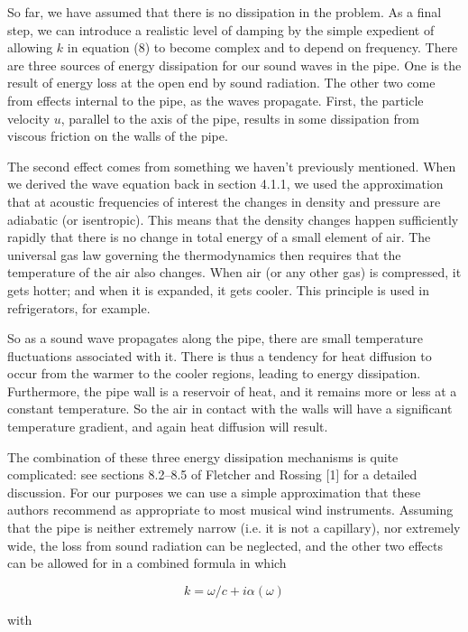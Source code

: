   So far, we have assumed that there is no dissipation in the problem. As a 
  final step, we can introduce a realistic level of damping by the simple 
  expedient of allowing $k$ in equation (8) to become complex and to depend on 
  frequency. There are three sources of energy dissipation for our sound waves 
  in the pipe. One is the result of energy loss at the open end by sound 
  radiation. The other two come from effects internal to the pipe, as the waves 
  propagate. First, the particle velocity $u$, parallel to the axis of the 
  pipe, results in some dissipation from viscous friction on the walls of the 
  pipe. 

  The second effect comes from something we haven't previously mentioned. When 
  we derived the wave equation back in section 4.1.1, we used the approximation 
  that at acoustic frequencies of interest the changes in density and pressure 
  are adiabatic (or isentropic). This means that the density changes happen 
  sufficiently rapidly that there is no change in total energy of a small 
  element of air. The universal gas law governing the thermodynamics then 
  requires that the temperature of the air also changes. When air (or any other 
  gas) is compressed, it gets hotter; and when it is expanded, it gets cooler. 
  This principle is used in refrigerators, for example. 

  So as a sound wave propagates along the pipe, there are small temperature 
  fluctuations associated with it. There is thus a tendency for heat diffusion 
  to occur from the warmer to the cooler regions, leading to energy 
  dissipation. Furthermore, the pipe wall is a reservoir of heat, and it 
  remains more or less at a constant temperature. So the air in contact with 
  the walls will have a significant temperature gradient, and again heat 
  diffusion will result. 

  The combination of these three energy dissipation mechanisms is quite 
  complicated: see sections 8.2--8.5 of Fletcher and Rossing [1] for a detailed 
  discussion. For our purposes we can use a simple approximation that these 
  authors recommend as appropriate to most musical wind instruments. Assuming 
  that the pipe is neither extremely narrow (i.e. it is not a capillary), nor 
  extremely wide, the loss from sound radiation can be neglected, and the other 
  two effects can be allowed for in a combined formula in which 

  $$k=\omega/c+i \alpha(\omega) \tag{9}$$ 

  with 

